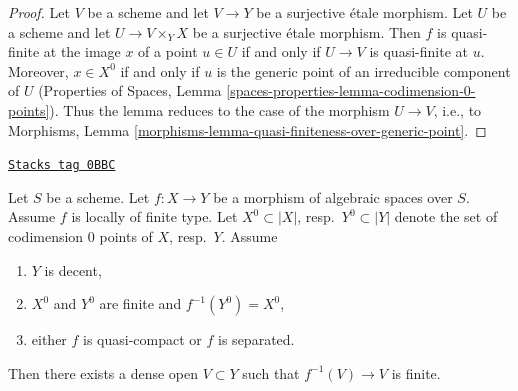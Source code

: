 \begin{proof}
Let $V$ be a scheme and let $V \to Y$ be a surjective \'etale morphism.
Let $U$ be a scheme and let $U \to V \times_Y X$ be a surjective \'etale
morphism. Then $f$ is quasi-finite at the image $x$ of a point $u \in U$
if and only if $U \to V$ is quasi-finite at $u$. Moreover, $x \in X^0$
if and only if $u$ is the generic point of an irreducible component
of $U$ (Properties of Spaces, Lemma
\ref{spaces-properties-lemma-codimension-0-points}).
Thus the lemma reduces to the case of the morphism $U \to V$, i.e., to
Morphisms, Lemma \ref{morphisms-lemma-quasi-finiteness-over-generic-point}.
\end{proof}

\begin{lemma}
\label{decent-spaces-lemma-finite-over-dense-open}
\href{https://stacks.math.columbia.edu/tag/0BBC}{\texttt{Stacks tag 0BBC}}

Let $S$ be a scheme. Let $f : X \to Y$ be a morphism of algebraic spaces
over $S$. Assume $f$ is locally of finite type.
Let $X^0 \subset |X|$, resp.\ $Y^0 \subset |Y|$ denote the set of
codimension $0$ points of $X$, resp.\ $Y$. Assume
\begin{enumerate}
\item $Y$ is decent,
\item $X^0$ and $Y^0$ are finite and $f^{-1}(Y^0) = X^0$,
\item either $f$ is quasi-compact or $f$ is separated.
\end{enumerate}
Then there exists a dense open $V \subset Y$
such that $f^{-1}(V) \to V$ is finite.
\end{lemma}

